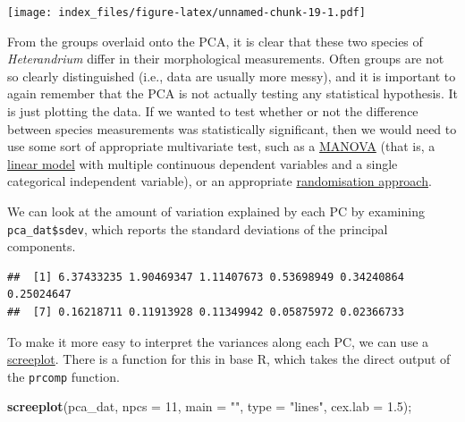 \documentclass[]{article}
\newenvironment{Shaded}{\begin{snugshade}}{\end{snugshade}}
\newcommand{\CommentTok}[1]{\textcolor[rgb]{0.56,0.35,0.01}{\textit{#1}}}
\newcommand{\DataTypeTok}[1]{\textcolor[rgb]{0.13,0.29,0.53}{#1}}
\newcommand{\DecValTok}[1]{\textcolor[rgb]{0.00,0.00,0.81}{#1}}
\newcommand{\FloatTok}[1]{\textcolor[rgb]{0.00,0.00,0.81}{#1}}
\newcommand{\KeywordTok}[1]{\textcolor[rgb]{0.13,0.29,0.53}{\textbf{#1}}}
\newcommand{\NormalTok}[1]{#1}
\newcommand{\OperatorTok}[1]{\textcolor[rgb]{0.81,0.36,0.00}{\textbf{#1}}}
\newcommand{\StringTok}[1]{\textcolor[rgb]{0.31,0.60,0.02}{#1}}
\begin{document}
\texttt{[image: index\_files/figure-latex/unnamed-chunk-19-1.pdf]}

From the groups overlaid onto the PCA, it is clear that these two
species of \emph{Heterandrium} differ in their morphological
measurements. Often groups are not so clearly distinguished (i.e., data
are usually more messy), and it is important to again remember that the
PCA is not actually testing any statistical hypothesis. It is just
plotting the data. If we wanted to test whether or not the difference
between species measurements was statistically significant, then we
would need to use some sort of appropriate multivariate test, such as a
\href{https://en.wikipedia.org/wiki/Multivariate_analysis_of_variance}{MANOVA}
(that is, a
\href{https://stirlingcodingclub.github.io/linear_modelling/}{linear
model} with multiple continuous dependent variables and a single
categorical independent variable), or an appropriate
\href{https://stirlingcodingclub.github.io/randomisation/randomisation_notes.html}{randomisation
approach}.

We can look at the amount of variation explained by each PC by examining
\texttt{pca\_dat\$sdev}, which reports the standard deviations of the
principal components.

\begin{Shaded}
\end{Shaded}

\begin{verbatim}
##  [1] 6.37433235 1.90469347 1.11407673 0.53698949 0.34240864 0.25024647
##  [7] 0.16218711 0.11913928 0.11349942 0.05875972 0.02366733
\end{verbatim}

To make it more easy to interpret the variances along each PC, we can
use a \href{https://en.wikipedia.org/wiki/Scree_plot}{screeplot}. There
is a function for this in base R, which takes the direct output of the
\texttt{prcomp} function.

\begin{Shaded}
\begin{Highlighting}[]
\KeywordTok{screeplot}\NormalTok{(pca_dat, }\DataTypeTok{npcs =} \DecValTok{11}\NormalTok{, }\DataTypeTok{main =} \StringTok{""}\NormalTok{, }\DataTypeTok{type =} \StringTok{"lines"}\NormalTok{, }\DataTypeTok{cex.lab =} \FloatTok{1.5}\NormalTok{);}
\end{Highlighting}
\end{Shaded}
\end{document}
